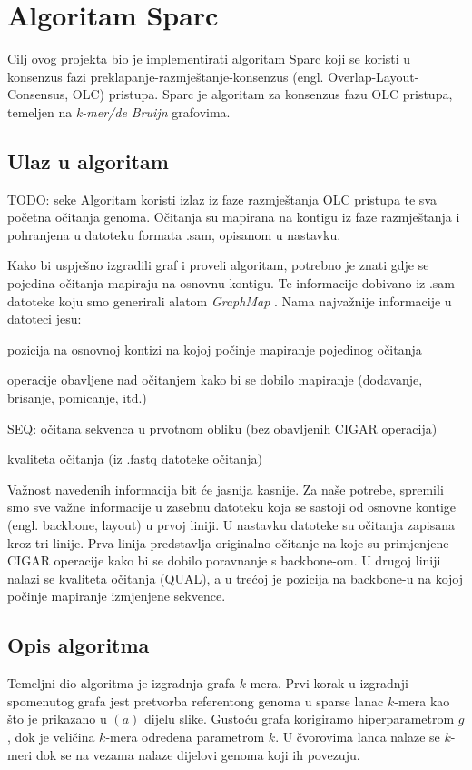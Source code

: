 \chapter{Algoritam Sparc}

Cilj ovog projekta bio je implementirati algoritam Sparc \citep{ye2016sparc} koji se koristi u konsenzus fazi preklapanje-razmještanje-konsenzus (engl. Overlap-Layout-Consensus, OLC) pristupa.
Sparc je algoritam za konsenzus fazu OLC pristupa, temeljen na \emph{k-mer/de Bruijn} \citep{hannenhalli1996positional} grafovima.

\section{Ulaz u algoritam}
TODO: seke
Algoritam koristi izlaz iz faze razmještanja OLC pristupa te sva početna očitanja genoma.
Očitanja su mapirana na kontigu iz faze razmještanja i pohranjena u datoteku formata .sam, opisanom u nastavku.

Kako bi uspješno izgradili graf i proveli algoritam, potrebno je znati gdje se pojedina očitanja mapiraju na osnovnu kontigu.
Te informacije dobivano iz .sam datoteke koju smo generirali alatom \emph{GraphMap} \citep{sovic2016fast}.
Nama najvažnije informacije u datoteci jesu:
\begin{description}
  \item [POS] pozicija na osnovnoj kontizi na kojoj počinje mapiranje pojedinog očitanja
  \item [CIGAR] operacije obavljene nad očitanjem kako bi se dobilo mapiranje (dodavanje, brisanje, pomicanje, itd.)
  \item SEQ: očitana sekvenca u prvotnom obliku (bez obavljenih CIGAR operacija)
  \item [QUAL] kvaliteta očitanja (iz .fastq datoteke očitanja)
\end{description}

Važnost navedenih informacija bit će jasnija kasnije.
Za naše potrebe, spremili smo sve važne informacije u zasebnu datoteku koja se sastoji od osnovne kontige (engl. backbone, layout) u prvoj liniji.
U nastavku datoteke su očitanja zapisana kroz tri linije.
Prva linija predstavlja originalno očitanje na koje su primjenjene CIGAR operacije kako bi se dobilo poravnanje s backbone-om.
U drugoj liniji nalazi se kvaliteta očitanja (QUAL), a u trećoj je pozicija na backbone-u na kojoj počinje mapiranje izmjenjene sekvence.

\section{Opis algoritma}
Temeljni dio algoritma je izgradnja grafa $k$-mera. Prvi korak u izgradnji spomenutog grafa jest pretvorba referentong genoma  u sparse lanac $k$-mera kao što je prikazano u $(a)$ dijelu slike. Gustoću grafa korigiramo hiperparametrom $g$, dok je veličina $k$-mera određena parametrom $k$. U čvorovima lanca nalaze se $k$-meri dok se na vezama nalaze dijelovi genoma koji ih povezuju. 

